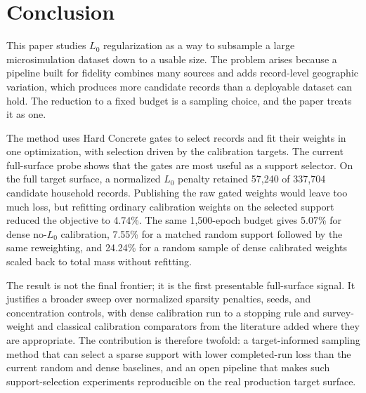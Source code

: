 \section{Conclusion}
\label{sp:sec:conclusion}

This paper studies $L_0$ regularization as a way to subsample a large microsimulation dataset down to
a usable size. The problem arises because a pipeline built for fidelity combines many sources and
adds record-level geographic variation, which produces more candidate records than a deployable dataset
can hold. The reduction to a fixed budget is a sampling choice, and the paper treats it as one.

The method uses Hard Concrete gates to select records and fit their weights in one optimization, with
selection driven by the calibration targets. The current full-surface probe shows that the gates are most
useful as a support selector. On the full \populace{} target surface, a normalized $L_0$ penalty retained
57{,}240 of 337{,}704 candidate household records. Publishing the raw gated weights would leave too much
loss, but refitting ordinary calibration weights on the selected support reduced the \populace{} objective to
4.74\%. The same 1{,}500-epoch budget gives 5.07\% for dense no-$L_0$ calibration, 7.55\% for a matched
random support followed by the same reweighting, and 24.24\% for a random sample of dense calibrated
weights scaled back to total mass without refitting.

The result is not the final frontier; it is the first presentable full-surface signal. It justifies a
broader sweep over normalized sparsity penalties, seeds, and concentration controls, with dense
calibration run to a stopping rule and survey-weight and classical calibration comparators from the
literature added where they are appropriate. The contribution is therefore twofold: a target-informed sampling method
that can select a sparse support with lower completed-run loss than the current random and dense baselines,
and an open \populace{} pipeline that makes such support-selection experiments reproducible on the real
production target surface.

